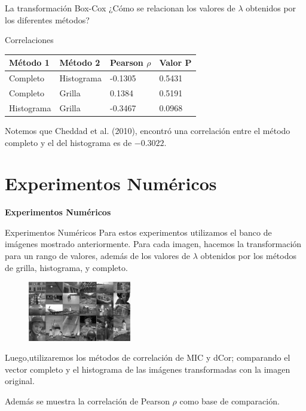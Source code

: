 \documentclass{beamer}
\begin{document}
\begin{frame}{La transformación Box-Cox}
    ¿Cómo se relacionan los valores de $\lambda$ obtenidos por los diferentes métodos? 
    \pause
    \begin{block}{Correlaciones}
        \begin{table}[H]
            \centering
            \begin{tabular}{|l|l|l|l|}
                \hline
                M\'etodo 1 & M\'etodo 2 & Pearson $\rho$ & Valor P \\ \hline
                Completo                  & Histograma                & -0.1305   & 0.5431  \\ 
                Completo                  & Grilla                    & 0.1384    & 0.5191  \\ 
                Histograma                & Grilla                    & -0.3467   & 0.0968  \\ \hline
            \end{tabular}
        \end{table}
    \end{block}
    \pause
    Notemos que Cheddad et al. (2010), encontró una correlación entre el método completo y el del histograma es de $-0.3022$.
\end{frame}



\section{Experimentos Numéricos}
\begin{frame}
    \begin{center}
        {\LARGE\bf Experimentos Numéricos}
    \end{center}
\end{frame}


\begin{frame}{Experimentos Numéricos}
    \pause
    Para estos experimentos utilizamos el banco de imágenes mostrado anteriormente. Para cada imagen, hacemos la transformación para un rango de valores, además de los valores de $\lambda$ obtenidos por los métodos de grilla, histograma, y completo.
    
    \begin{figure}[H]
        \centering
        \includegraphics[width=0.4\textwidth]{all_images_grid_bw.png}
    \end{figure}
    \pause
    Luego,utilizaremos los métodos de correlación de MIC y dCor; comparando el vector completo y el histograma de las imágenes transformadas con la imagen original.
    
    Además se muestra la correlación de Pearson $\rho$ como base de comparación.
\end{frame}
\end{document}
